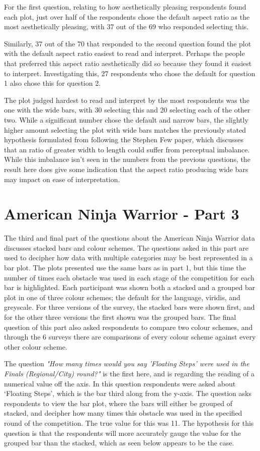 \documentclass[
  11pt,
]{book}
\begin{document}
For the first question, relating to how aesthetically pleasing
respondents found each plot, just over half of the respondents chose the
default aspect ratio as the most aesthetically pleasing, with 37 out of
the 69 who responded selecting this.

Similarly, 37 out of the 70 that responded to the second question found
the plot with the default aspect ratio easiest to read and interpret.
Perhaps the people that preferred this aspect ratio aesthetically did so
because they found it easiest to interpret. Investigating this, 27
respondents who chose the default for question 1 also chose this for
question 2.

The plot judged hardest to read and interpret by the most respondents
was the one with the wide bars, with 30 selecting this and 20 selecting
each of the other two. While a significant number chose the default and
narrow bars, the slightly higher amount selecting the plot with wide
bars matches the previously stated hypothesis formulated from following
the Stephen Few paper, which discusses that an ratio of greater width to
length could suffer from perceptual imbalance. While this imbalance
isn't seen in the numbers from the previous questions, the result here
does give some indication that the aspect ratio producing wide bars may
impact on ease of interpretation.

\section{American Ninja Warrior - Part 3}

The third and final part of the questions about the American Ninja
Warrior data discusses stacked bars and colour schemes. The questions
asked in this part are used to decipher how data with multiple
categories may be best represented in a bar plot. The plots presented
use the same bars as in part 1, but this time the number of times each
obstacle was used in each stage of the competition for each bar is
highlighted. Each participant was shown both a stacked and a grouped bar
plot in one of three colour schemes; the default for the language,
viridis, and greyscale. For three versions of the survey, the stacked
bars were shown first, and for the other three versions the first shown
was the grouped bars. The final question of this part also asked
respondents to compare two colour schemes, and through the 6 surveys
there are comparisons of every colour scheme against every other colour
scheme.

The question
\textit{"How many times would you say 'Floating Steps' were used in the Finals (Regional/City) round?"}
is the first here, and is regarding the reading of a numerical value off
the axis. In this question respondents were asked about `Floating
Steps', which is the bar third along from the y-axis. The question asks
respondents to view the bar plot, where the bars will either be grouped
of stacked, and decipher how many times this obstacle was used in the
specified round of the competition. The true value for this was 11. The
hypothesis for this question is that the respondents will more
accurately gauge the value for the grouped bar than the stacked, which
as seen below appears to be the case.
\end{document}
